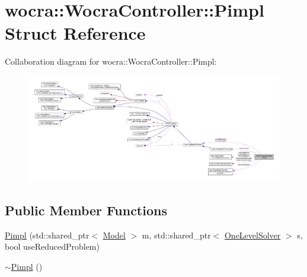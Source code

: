 \hypertarget{structwocra_1_1WocraController_1_1Pimpl}{}\section{wocra\+:\+:Wocra\+Controller\+:\+:Pimpl Struct Reference}
\label{structwocra_1_1WocraController_1_1Pimpl}


Collaboration diagram for wocra\+:\+:Wocra\+Controller\+:\+:Pimpl\+:
\nopagebreak
\begin{figure}[H]
\begin{center}
\leavevmode
\includegraphics[width=350pt]{d8/d8f/structwocra_1_1WocraController_1_1Pimpl__coll__graph}
\end{center}
\end{figure}
\subsection*{Public Member Functions}
\begin{DoxyCompactItemize}
\item 
\hyperlink{structwocra_1_1WocraController_1_1Pimpl_ae9e38baadd765c1005354808ea768800}{Pimpl} (std\+::shared\+\_\+ptr$<$ \hyperlink{classocra_1_1Model}{Model} $>$ m, std\+::shared\+\_\+ptr$<$ \hyperlink{classocra_1_1OneLevelSolver}{One\+Level\+Solver} $>$ s, bool use\+Reduced\+Problem)
\item 
\hyperlink{structwocra_1_1WocraController_1_1Pimpl_a9e7ca6582122e345e4d51d30ed481450}{$\sim$\+Pimpl} ()
\end{DoxyCompactItemize}
